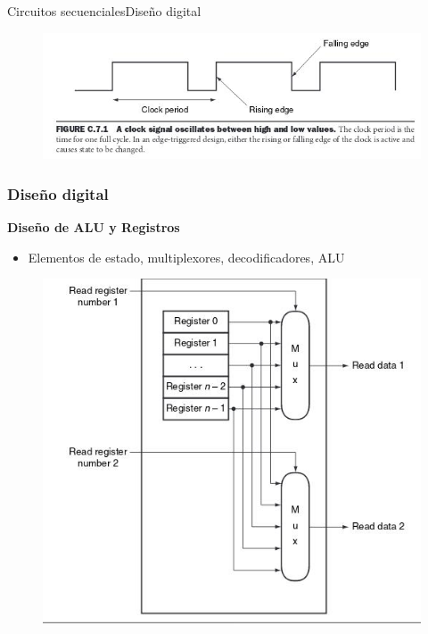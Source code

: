 \documentclass[aspectratio=169,compress]{beamer}
\begin{document}
\begin{footnotesize}
\begin{frame}{Circuitos secuenciales}{Diseño digital}
\begin{figure}
\includegraphics[scale=0.4]{images/reloj.jpg} 
\end{figure}
\end{frame}

\begin{frame}[fragile]
\frametitle{Diseño digital}
\begin{center}\textbf{Diseño de ALU y Registros}\end{center}
\begin{itemize}
\item Elementos de estado, multiplexores, decodificadores, ALU
\end{itemize}
\begin{figure}
\includegraphics[scale=0.4]{images/leer-registro.jpg} 
\end{figure}
\end{frame}


\end{footnotesize}
\end{document}
